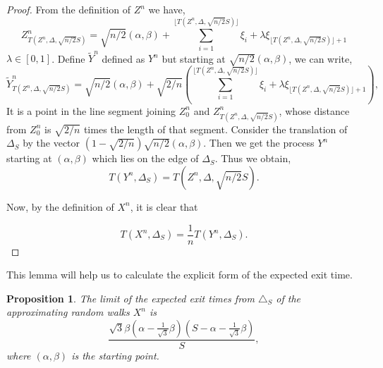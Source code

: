 \documentclass[11pt, a4paper, oneside]{report}
\numberwithin{equation}{section}
\newtheorem{proposition}[theorem]{Proposition}
\begin{document}
\begin{proof}
\noindent From the definition of $Z^n$ we have,
\[
Z^n_{T(Z^n, \Delta, \sqrt{n/2}S)} = \sqrt{n/2}(\alpha, \beta) + 
\sum_{i=1}^{\lfloor T(Z^n, \Delta, \sqrt{n/2}S) \rfloor} \xi_i + 
\lambda \xi_{\lfloor T(Z^n, \Delta, \sqrt{n/2}S) \rfloor + 1}
\]
$\lambda \in [0, 1]$. Define $\tilde{Y}^n$ defined as $Y^n$ but starting at $\sqrt{n/2}(\alpha, \beta)$, we can write,
\[
\tilde{Y}^n_{T(Z^n, \Delta, \sqrt{n/2}S)} = \sqrt{n/2}(\alpha, \beta) + \sqrt{2/n} \left( 
\sum_{i=1}^{\lfloor T(Z^n, \Delta, \sqrt{n/2}S) \rfloor} \xi_i + 
\lambda \xi_{\lfloor T(Z^n, \Delta, \sqrt{n/2}S) \rfloor + 1}
\right),
\]
\noindent It is a point in the line segment joining $Z^n_0$ and $Z^n_{T(Z^n, \Delta, \sqrt{n/2}S)}$, whose distance from $Z^n_0$ is $\sqrt{2/n}$ times the length of that segment. Consider the translation of $\Delta_S$ by the vector $(1 - \sqrt{2/n})\sqrt{n/2}(\alpha, \beta)$. Then we get the process  $Y^n$ starting at $(\alpha,\beta)$ which lies on the edge of $\Delta_S$. Thus we obtain,
\[
T(Y^n, \Delta_S) = T(Z^n, \Delta, \sqrt{n/2}S).
\]

Now, by the definition of $X^n$, it is clear that

\[
T(X^n, \Delta_S) = \frac{1}{n} T(Y^n, \Delta_S).
\]

\end{proof}
This lemma will help us to calculate the explicit form of the expected exit time.
\begin{proposition}\cite[Proposition 7]{research}
The limit of the expected exit times from $\triangle_S$ of the approximating random walks $X^n$ is
\[
\frac{ \sqrt{3}\beta \left( \alpha - \frac{1}{\sqrt{3}}\beta \right) \left( S - \alpha - \frac{1}{\sqrt{3}}\beta \right) }{S}, \tag{14}
\]
where $(\alpha, \beta)$ is the starting point.

\end{proposition}
\end{document}
